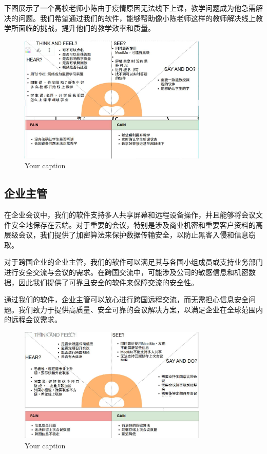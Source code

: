 \documentclass[a4paper,12pt]{article}
\begin{document}
下图展示了一个高校老师小陈由于疫情原因无法线下上课，教学问题成为他急需解决的问题。我们希望通过我们的软件，能够帮助像小陈老师这样的教师解决线上教学所面临的挑战，提升他们的教学效率和质量。
\begin{figure}[h]
    \centering
    \includegraphics[width=0.8\textwidth]{高校移情图.jpg}
    \caption{Your caption}
\end{figure}
\clearpage


\subsection{企业主管}
在企业会议中，我们的软件支持多人共享屏幕和远程设备操作，并且能够将会议文件安全地保存在云端。对于重要的会议，特别是涉及商业机密和重要客户资料的高层级会议，我们提供了加密算法来保护数据传输安全，以防止黑客入侵和信息窃取。

对于跨国企业的企业主管，我们的软件可以满足其与各国小组成员或支持业务部门进行安全交流与会议的需求。在跨国交流中，可能涉及公司的敏感信息和机密数据，因此我们提供了可靠且安全的软件来保障交流的安全性。

通过我们的软件，企业主管可以放心进行跨国远程交流，而无需担心信息安全问题。我们致力于提供高质量、安全可靠的会议解决方案，以满足企业在全球范围内的远程会议需求。
\begin{figure}[h]
    \centering
    \includegraphics[width=0.8\textwidth]{企业移情图.jpg}
    \caption{Your caption}
\end{figure}
\clearpage
\end{document}
